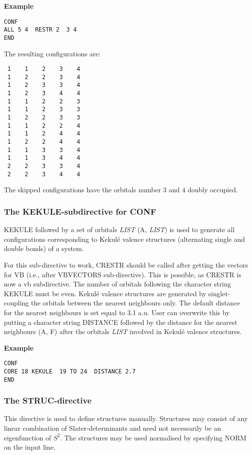 \documentclass[11pt,fleqn]{article}
\begin{document}
{\bf Example}
\begin{verbatim}
CONF
ALL 5 4  RESTR 2  3 4
END
\end{verbatim}

The resulting configurations are:

\begin{verbatim}
 1    1    2    3    4
 1    2    2    3    4
 1    2    3    3    4
 1    2    3    4    4
 1    1    2    2    3
 1    1    2    3    3
 1    2    2    3    3
 1    1    2    2    4
 1    1    2    4    4
 1    2    2    4    4
 1    1    3    3    4
 1    1    3    4    4
 2    2    3    3    4
 2    2    3    4    4
\end{verbatim}

The skipped configurations have the orbitals number $3$ and $4$ doubly occupied.

\subsubsection{The KEKULE-subdirective for CONF}

KEKULE followed by a set of orbitals {\em LIST} (A, {\em LIST}) is used to generate all configurations corresponding to
Kekul\'e valence structures (alternating single and double bonds) of a system.

For this sub-directive to work, CRESTR should be called after getting the
vectors for VB (i.e., after VBVECTORS sub-directive). This is possible, as CRESTR is now
a vb subdirective. The number
of orbitals following the character string KEKULE must be even. Kekul\'e valence 
structures are generated by singlet-coupling the orbitals between the nearest neighbours only.
The default distance for the nearest neighbours is set equal to 3.1 a.u. User 
can overwrite this by putting a character string DISTANCE followed by the 
distance for the nearest neighbours (A, F) after the orbitals {\em LIST} involved in Kekul\'e valence
structures.

{\bf Example}
\begin{verbatim}
CONF
CORE 18 KEKULE  19 TO 24  DISTANCE 2.7
END
\end{verbatim}


\subsubsection{The STRUC-directive}

This directive is used to define structures manually. Structures may consist 
of any linear combination of Slater-determinants and need not necessarily be 
an eigenfunction of $S^2$. The structures may be used normalised by specifying 
NORM on the input line.
\end{document}
